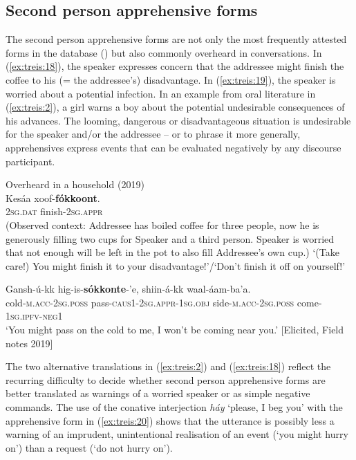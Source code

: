 \documentclass[output=paper,colorlinks,citecolor=brown,]{langscibook}
\begin{document}
\subsection{Second person apprehensive forms}\label{sec:treis:3.3}

The second person apprehensive forms are not only the most frequently attested forms in the database () but also commonly overheard in conversations. In (\ref{ex:treis:18}), the speaker expresses concern that the addressee might finish the coffee to his (= the addressee's) disadvantage. In (\ref{ex:treis:19}), the speaker is worried about a potential infection. In an example from oral literature in (\ref{ex:treis:2}), a girl warns a boy about the potential undesirable consequences of his advances. The looming, dangerous or disadvantageous situation is undesirable for the speaker and/or the addressee -- or to phrase it more generally, apprehensives express events that can be evaluated negatively by any discourse participant.

\ea\label{ex:treis:18} \textnormal{Overheard in a  household (2019)}\\
\gll Kesáa	xoof-\textbf{fókkoont}. \\
\textsc{2sg.dat} finish-\textsc{2sg.appr}\\
\glt (Observed context: Addressee has boiled coffee for three people, now he is generously filling two cups for Speaker and a third person. Speaker is worried that not enough will be left in the pot to also fill Addressee's own cup.) `(Take care!) You might finish it to your disadvantage!'\slash `Don't finish it off on yourself!'\\
\z 

\ea\label{ex:treis:19} 
\gll Gansh-ú-kk 			hig-is-\textbf{sókkonte}-'e, shiin-á-kk 				waal-áam-ba'a. \\ 
cold-\textsc{m.acc-2sg.poss} pass-\textsc{caus1-2sg.appr-1sg.obj} side-\textsc{m.acc-2sg.poss} 	come-\textsc{1sg.ipfv-neg1}\\
\glt `You might pass on the cold to me, I won't be coming near you.' [Elicited, Field notes 2019]
\z 

 The two alternative translations in (\ref{ex:treis:2}) and (\ref{ex:treis:18}) reflect the recurring difficulty to decide whether second person apprehensive forms are better translated as warnings of a worried speaker or as simple negative commands. The use of the conative interjection \textit{háy} `please, I beg you' with the apprehensive form in (\ref{ex:treis:20}) shows that the utterance is possibly less a warning of an imprudent, unintentional realisation of an event (`you might hurry on') than a request (`do not hurry on').
\end{document}
